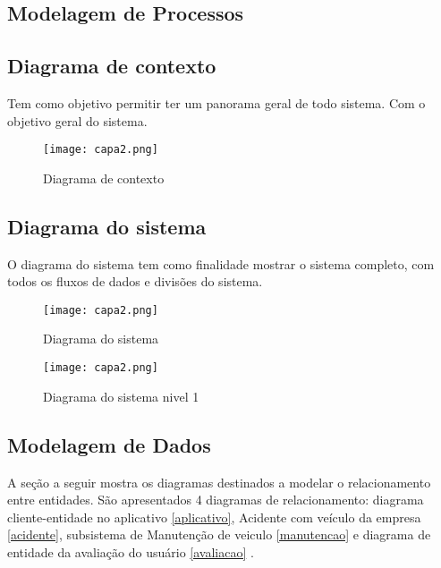 \subsection{Modelagem de Processos}

\subsection{Diagrama de contexto}
Tem como objetivo permitir ter um panorama geral de todo sistema. Com o objetivo geral do sistema.
\begin{figure}[H]
      \begin{center}
            \caption{ Diagrama de contexto} \label{afp}
            \texttt{[image: capa2.png]} \\

      \end{center}
\end{figure}

\subsection{Diagrama do sistema }
O diagrama do sistema tem como finalidade mostrar o sistema completo, com todos os fluxos de dados e divisões do sistema.

\begin{figure}[H]
      \begin{center}
            \caption{Diagrama do sistema} \label{afp}
            \texttt{[image: capa2.png]} \\

      \end{center}
\end{figure}


\begin{figure}[H]
      \begin{center}
            \caption{Diagrama do sistema nivel 1} \label{afp}
            \texttt{[image: capa2.png]} \\

      \end{center}
\end{figure}


\subsection{Modelagem de Dados}
A seção a seguir mostra os diagramas destinados a modelar o relacionamento entre entidades. São apresentados 4 diagramas de relacionamento: diagrama cliente-entidade no aplicativo \ref{aplicativo}, Acidente com veículo da empresa \ref{acidente},  subsistema de Manutenção de veiculo \ref{manutencao} e diagrama de entidade da avaliação do usuário \ref{avaliacao} .
